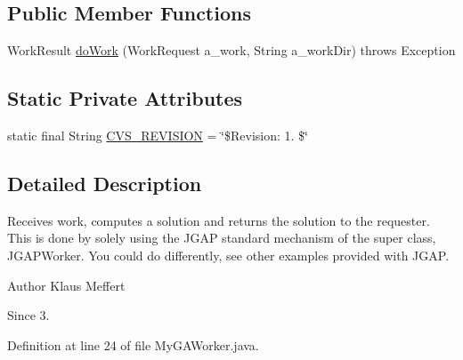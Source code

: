 \subsection*{Public Member Functions}
\begin{DoxyCompactItemize}
\item 
Work\-Result \hyperlink{classexamples_1_1grid_1_1math_problem_distributed_1_1_my_g_a_worker_a0bba968aa2d58558a972ca8fa2c4e9de}{do\-Work} (Work\-Request a\-\_\-work, String a\-\_\-work\-Dir)  throws Exception 
\end{DoxyCompactItemize}
\subsection*{Static Private Attributes}
\begin{DoxyCompactItemize}
\item 
static final String \hyperlink{classexamples_1_1grid_1_1math_problem_distributed_1_1_my_g_a_worker_aba924c9ae9ce3b9fa2a893f5ddd11a22}{C\-V\-S\-\_\-\-R\-E\-V\-I\-S\-I\-O\-N} = \char`\"{}\$Revision\-: 1. \$\char`\"{}
\end{DoxyCompactItemize}


\subsection{Detailed Description}
Receives work, computes a solution and returns the solution to the requester. This is done by solely using the J\-G\-A\-P standard mechanism of the super class, J\-G\-A\-P\-Worker. You could do differently, see other examples provided with J\-G\-A\-P.

\begin{DoxyAuthor}{Author}
Klaus Meffert 
\end{DoxyAuthor}
\begin{DoxySince}{Since}
3. 
\end{DoxySince}


Definition at line 24 of file My\-G\-A\-Worker.\-java.



